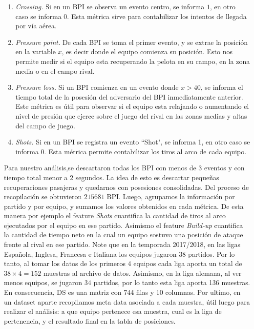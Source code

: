 \documentclass[]{article}
\begin{document}
\begin{enumerate}
    \item {\it Crossing.} Si en un BPI se observa un evento centro, se informa $1$, en otro caso se informa $0$. Esta métrica sirve para contabilizar los intentos de llegada por vía aérea.

    \item {\it Pressure point.} De cada BPI se toma el primer evento, y se extrae la posición en la variable $x$, es decir donde el equipo comienza su posición. Esto nos permite medir si el equipo esta recuperando la pelota en su campo, en la zona media o en el campo rival.
 
    \item {\it Pressure loss.} Si un BPI comienza en un evento donde $x>40$, se informa el tiempo total de la posesión del adversario del BPI inmediatamente anterior. Este métrica es útil para observar si el equipo esta relajando o aumentando el nivel de presión que ejerce sobre el juego del rival en las zonas medias y altas del campo de juego.

    \item {\it Shots.} Si en un BPI se registra un evento ``Shot", se informa 1, en otro caso se informa $0$. Esta métrica permite contabilizar los tiros al arco de cada equipo.
    
\end{enumerate}

Para nuestro análisis,se descartaron todas los BPI con menos de 3 eventos y con tiempo total menor a 2 segundos. La idea de esto es descartar pequeñas recuperaciones pasajeras y quedarnos con posesiones consolidadas.
Del proceso de recopilación se obtuvieron $215681$ BPI.
%
%
Luego, agrupamos la información por partido y por equipo, y sumamos los valores obtenidos en cada métrica. De esta manera por ejemplo el feature {\it Shots} cuantifica la cantidad de tiros al arco ejecutados por el equipo en ese partido.
Asimismo el feature {\it Build-up} cuantifica la cantidad de tiempo neto en la cual un equipo sostuvo una posición de ataque frente al rival en ese partido.
%
Note que en la temporada 2017/2018, en las ligas Española, Inglesa, Francesa e Italiana los equipos jugaron 38 partidos. Por lo tanto, al tomar los datos de los primeros 4 equipos cada liga aporta un total de $38\times4=152$ muestras al archivo de datos. Asimismo, en la liga alemana, al ver menos equipos, se jugaron 34 partidos, por lo tanto esta liga aporta 136 muestras. 
%
En consecuencia, DS es una matriz con 744 filas y 10 columnas. 
Por ultimo, en un dataset aparte recopilamos meta data asociada a cada muestra, útil luego para realizar el análisis: a que equipo pertenece esa muestra, cual es la liga de pertenencia, y el resultado final en la tabla de posiciones. 
\end{document}
